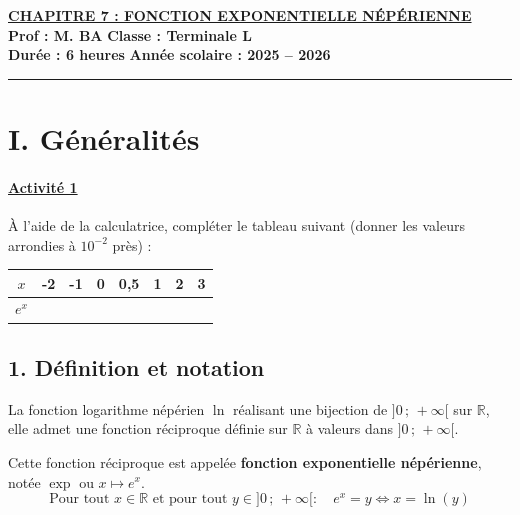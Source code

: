 \documentclass[12pt,a4paper]{article}
\begin{document}
\begin{center}
    \Large\textbf{\underline{\textcolor{myred}{CHAPITRE 7 : FONCTION EXPONENTIELLE NÉPÉRIENNE}}}\\[0.2cm]
    \normalsize\textbf{Prof : M. BA} \hfill \textbf{Classe : Terminale L}\\[0.1cm]
    \textbf{Durée : 6 heures} \hfill \textbf{Année scolaire : 2025 -- 2026}
\end{center}
\hrule
\vspace{0.3cm}


\section*{\color{myred}I. Généralités}

\paragraph{\underline{Activité 1}}
À l'aide de la calculatrice, compléter le tableau suivant (donner les valeurs arrondies à $10^{-2}$ près) :

\begin{center}
\renewcommand{\arraystretch}{1.5}
\begin{tabular}{|c|c|c|c|c|c|c|c|}
\hline
$x$ & -2 & -1 & 0 & 0,5 & 1 & 2 & 3 \\
\hline
$e^x$ & \hspace*{0.8cm} & \hspace*{0.8cm} & \hspace*{0.8cm} & \hspace*{0.8cm} & \hspace*{0.8cm} & \hspace*{0.8cm} & \hspace*{0.8cm} \\
\hline
\end{tabular}
\end{center}

\vspace{0.3cm}

\subsection*{\color{myred}1. Définition et notation}
\begin{tcolorbox}[colback=blue!5!white,colframe=myblue,title=\textbf{Définition}]
La fonction logarithme népérien $\ln$ réalisant une bijection de $]0\,;\,+\infty[$ sur $\mathbb{R}$, elle admet une fonction réciproque définie sur $\mathbb{R}$ à valeurs dans $]0\,;\,+\infty[$. 

Cette fonction réciproque est appelée \textbf{fonction exponentielle népérienne}, notée $\exp$ ou $x \mapsto e^x$.
\[
\text{Pour tout } x \in \mathbb{R} \text{ et pour tout } y \in ]0\,;\,+\infty[ : \quad e^x = y \iff x = \ln(y)
\]
\end{tcolorbox}
\end{document}
